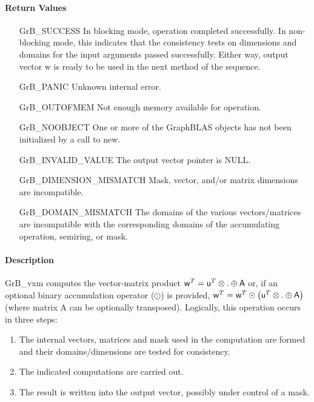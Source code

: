 \paragraph{Return Values}

\begin{itemize}[leftmargin=2.1in]
    \item[{\sf GrB\_SUCCESS}]         In blocking mode, operation
	completed successfully. In non-blocking mode, this indicates
	that the consistency tests on dimensions and domains for the
	input arguments passed successfully. Either way, output vector
	{\sf w} is ready to be used in the next method of the sequence.

    \item[{\sf GrB\_PANIC}]           Unknown internal error.
    
    \item[{\sf GrB\_OUTOFMEM}]        Not enough memory available for operation.
    
    \item[{\sf GrB\_NOOBJECT}]        One or more of the GraphBLAS objects has
    not been initialized by a call to {\sf new}.
    
    \item[{\sf GrB\_INVALID\_VALUE}]  The output vector pointer is {\sf NULL}.
    
    \item[{\sf GrB\_DIMENSION\_MISMATCH}] Mask, vector, and/or matrix 
    dimensions are incompatible.

	\item[{\sf GrB\_DOMAIN\_MISMATCH}]    The domains of the various
	vectors/matrices are incompatible with the corresponding domains of the
	accumulating operation, semiring, or mask.
\end{itemize}

\paragraph{Description}

{\sf GrB\_vxm} computes the vector-matrix product ${\sf w}^T = {\sf
u}^T \otimes . \oplus {\sf A}$ or, if an optional binary accumulation
operator ($\odot$) is provided, ${\sf w}^T = {\sf w}^T \odot
\left({\sf u}^T \otimes . \oplus {\sf A}\right)$ (where matrix {\sf A}
 can be optionally transposed).  Logically, this operation
occurs in three steps:
\begin{enumerate}
\item The internal vectors, matrices and mask used in the computation are formed and their domains/dimensions are tested for consistency.
\item The indicated computations are carried out.
\item The result is written into the output vector, possibly under control of a mask.
\end{enumerate}

